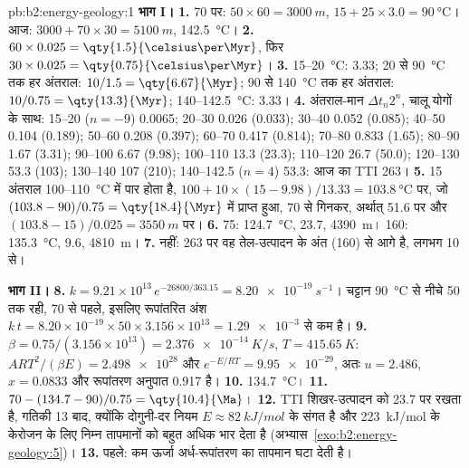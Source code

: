 \begin{solution}{pb:b2:energy-geology:1}
\noindent\textbf{भाग I।}
\textbf{1.} \qty{70}{\Ma} पर: $50 \times 60 = \qty{3000}{m}$, $15 + 25 \times 3.0 =
\qty{90}{\celsius}$। आज: $3000 + 70 \times 30 = \qty{5100}{m}$, \qty{142.5}{\celsius}।
\textbf{2.} $60 \times 0.025 = \qty{1.5}{\celsius\per\Myr}$, फिर $30 \times 0.025 =
\qty{0.75}{\celsius\per\Myr}$।
\textbf{3.} 15--\qty{20}{\celsius}: \qty{3.33}{\Myr}; 20 से \qty{90}{\celsius} तक हर अंतराल:
$10/1.5 = \qty{6.67}{\Myr}$; 90 से \qty{140}{\celsius} तक हर अंतराल: $10/0.75 = \qty{13.3}{\Myr}$;
140--\qty{142.5}{\celsius}: \qty{3.33}{\Myr}।
\textbf{4.} अंतराल-मान $\Delta t_n 2^n$, चालू योगों के साथ: 15--20 ($n = -9$) 0.0065; 20--30
0.026 (0.033); 30--40 0.052 (0.085); 40--50 0.104 (0.189); 50--60 0.208 (0.397); 60--70 0.417
(0.814); 70--80 0.833 (1.65); 80--90 1.67 (3.31); 90--100 6.67 (9.98); 100--110 13.3 (23.3);
110--120 26.7 (50.0); 120--130 53.3 (103); 130--140 107 (210); 140--142.5 ($n = 4$) 53.3: आज का
TTI 263।
\textbf{5.} 15 अंतराल 100--\qty{110}{\celsius} में पार होता है, $100 + 10 \times
(15 - 9.98)/13.33 = \qty{103.8}{\celsius}$ पर, जो $(103.8 - 90)/0.75 = \qty{18.4}{\Myr}$ में प्राप्त हुआ, \qty{70}{\Ma} से गिनकर,
अर्थात् \qty{51.6}{\Ma} पर और $(103.8 - 15)/0.025 = \qty{3550}{m}$ पर।
\textbf{6.} 75: \qty{124.7}{\celsius}, \qty{23.7}{\Ma}, \qty{4390}{m}। 160: \qty{135.3}{\celsius},
\qty{9.6}{\Ma}, \qty{4810}{m}।
\textbf{7.} नहीं: 263 पर वह तेल-उत्पादन के अंत (160) से आगे है, लगभग \qty{10}{\Ma} से।

\noindent\textbf{भाग II।}
\textbf{8.} $k = 9.21 \times 10^{13}\,e^{-26800/363.15} = \qty{8.20e-19}{s^{-1}}$। चट्टान \qty{90}{\celsius} से नीचे
\qty{50}{\Myr} तक रही, \qty{70}{\Ma} से पहले, इसलिए रूपांतरित अंश
$k\,t = 8.20 \times 10^{-19} \times 50 \times 3.156 \times 10^{13} = \num{1.29e-3}$ से कम है।
\textbf{9.} $\beta = 0.75/(3.156 \times 10^{13}) = \qty{2.376e-14}{K/s}$, $T = \qty{415.65}{K}$:
$ART^2/(\beta E) = \num{2.498e28}$ और $e^{-E/RT} = \num{9.95e-29}$, अतः $u = 2.486$, $x = 0.0833$ और
रूपांतरण अनुपात 0.917 है।
\textbf{10.} \qty{134.7}{\celsius}।
\textbf{11.} $70 - (134.7 - 90)/0.75 = \qty{10.4}{\Ma}$।
\textbf{12.} TTI शिखर-उत्पादन को \qty{23.7}{\Ma} पर रखता है, गतिकी \qty{13}{\Myr} बाद,
क्योंकि दोगुनी-दर नियम $E \approx \qty{82}{kJ/mol}$ के संगत है और \qty{223}{kJ/mol} के केरोजन के लिए निम्न
तापमानों को बहुत अधिक भार देता है (अभ्यास~\ref{exo:b2:energy-geology:5})।
\textbf{13.} पहले: कम ऊर्जा अर्ध-रूपांतरण का तापमान घटा देती है।


\end{solution}
